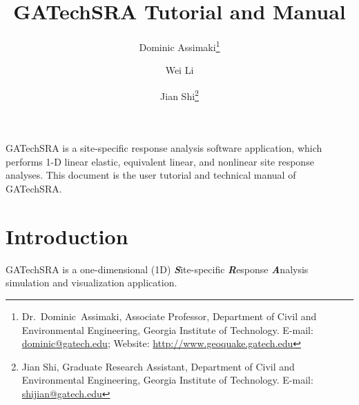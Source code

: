 \documentclass[11pt,letterpaper]{article}
\title{\textbf{\textsf{\huge{GATechSRA Tutorial and Manual}}}}
\author{{\textsf{\Large{Dominic Assimaki}}}\thanks{Dr.~Dominic~Assimaki, Associate Professor, Department of Civil and Environmental Engineering, Georgia Institute of Technology. E-mail: \href{mailto:dominic@gatech.edu}{\textsf{dominic@gatech.edu}}; Website: \href{http://www.geoquake.gatech.edu}{\textsf{http://www.geoquake.gatech.edu}}} \and {\textsf{\Large{Wei Li}}}\and {\textsf{\Large{Jian Shi}}}\thanks{Jian Shi, Graduate Research Assistant, Department of Civil and Environmental Engineering, Georgia Institute of Technology. E-mail: \href{mailto:shijian@gatech.edu}{\textsf{shijian@gatech.edu}}}}
\date{}
\begin{document}
  \maketitle

GATechSRA is a site-specific response analysis software application, which performs 1-D linear elastic, equivalent linear, and nonlinear site response analyses. This document is the user tutorial and technical manual of GATechSRA.


\newpage
\tableofcontents

\newpage
\section{Introduction}

GATechSRA is a one-dimensional (1D) \textbf{\emph{{S}}}ite-specific \textbf{\emph{{R}}}esponse \textbf{\emph{{A}}}nalysis simulation and visualization application.
\end{document}
